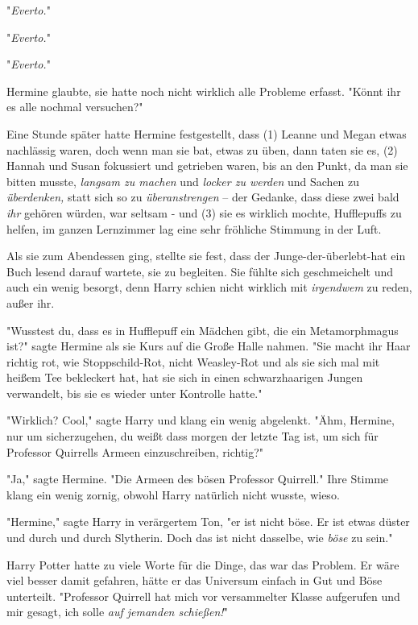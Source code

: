 {"\emph{Everto.}"

"\emph{Everto.}"

"\emph{Everto.}"

Hermine glaubte, sie hatte noch nicht wirklich alle Probleme erfasst. "Könnt ihr es alle nochmal versuchen?"

Eine Stunde später hatte Hermine festgestellt, dass (1) Leanne und Megan etwas nachlässig waren, doch wenn man sie bat, etwas zu üben, dann taten sie es, (2) Hannah und Susan fokussiert und getrieben waren, bis an den Punkt, da man sie bitten musste, \emph{langsam zu machen} und \emph{locker zu werden} und Sachen zu \emph{überdenken,} statt sich so zu \emph{überanstrengen} -- der Gedanke, dass diese zwei bald \emph{ihr} gehören würden, war seltsam - und (3) sie es wirklich mochte, Hufflepuffs zu helfen, im ganzen Lernzimmer lag eine sehr fröhliche Stimmung in der Luft.

Als sie zum Abendessen ging, stellte sie fest, dass der Junge-der-überlebt-hat ein Buch lesend darauf wartete, sie zu begleiten. Sie fühlte sich geschmeichelt und auch ein wenig besorgt, denn Harry schien nicht wirklich mit \emph{irgendwem} zu reden, außer ihr.

"Wusstest du, dass es in Hufflepuff ein Mädchen gibt, die ein Metamorphmagus ist?" sagte Hermine als sie Kurs auf die Große Halle nahmen. "Sie macht ihr Haar richtig rot, wie Stoppschild-Rot, nicht Weasley-Rot und als sie sich mal mit heißem Tee bekleckert hat, hat sie sich in einen schwarzhaarigen Jungen verwandelt, bis sie es wieder unter Kontrolle hatte."

"Wirklich? Cool," sagte Harry und klang ein wenig abgelenkt. "Ähm, Hermine, nur um sicherzugehen, du weißt dass morgen der letzte Tag ist, um sich für Professor Quirrells Armeen einzuschreiben, richtig?"

"Ja," sagte Hermine. "Die Armeen des bösen Professor Quirrell." Ihre Stimme klang ein wenig zornig, obwohl Harry natürlich nicht wusste, wieso.

"Hermine," sagte Harry in verärgertem Ton, "er ist nicht böse. Er ist etwas düster und durch und durch Slytherin. Doch das ist nicht dasselbe, wie \emph{böse} zu sein."

Harry Potter hatte zu viele Worte für die Dinge, das war das Problem. Er wäre viel besser damit gefahren, hätte er das Universum einfach in Gut und Böse unterteilt. "Professor Quirrell hat mich vor versammelter Klasse aufgerufen und mir gesagt, ich solle \emph{auf jemanden schießen!}"

}

